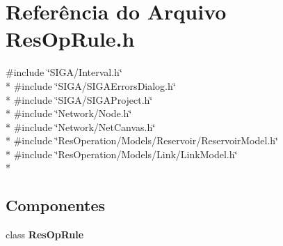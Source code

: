\section{Referência do Arquivo Res\+Op\+Rule.\+h}
\label{_rule_2_res_op_rule_8h}
{\ttfamily \#include \char`\"{}S\+I\+G\+A/\+Interval.\+h\char`\"{}}\\*
{\ttfamily \#include \char`\"{}S\+I\+G\+A/\+S\+I\+G\+A\+Errors\+Dialog.\+h\char`\"{}}\\*
{\ttfamily \#include \char`\"{}S\+I\+G\+A/\+S\+I\+G\+A\+Project.\+h\char`\"{}}\\*
{\ttfamily \#include \char`\"{}Network/\+Node.\+h\char`\"{}}\\*
{\ttfamily \#include \char`\"{}Network/\+Net\+Canvas.\+h\char`\"{}}\\*
{\ttfamily \#include \char`\"{}Res\+Operation/\+Models/\+Reservoir/\+Reservoir\+Model.\+h\char`\"{}}\\*
{\ttfamily \#include \char`\"{}Res\+Operation/\+Models/\+Link/\+Link\+Model.\+h\char`\"{}}\\*
\subsection*{Componentes}
\begin{DoxyCompactItemize}
\item 
class {\bf Res\+Op\+Rule}
\end{DoxyCompactItemize}

